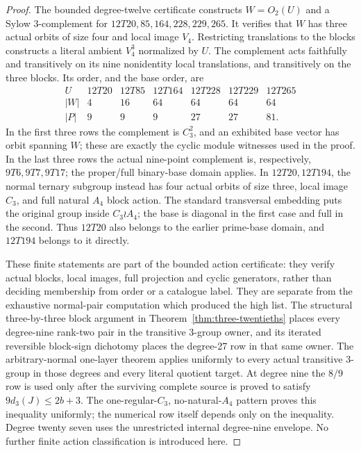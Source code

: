 \begin{proof}
The bounded degree-twelve certificate constructs $W=O_2(U)$ and a
Sylow $3$-complement for $12T20,85,164,228,229,265$. It verifies
that $W$ has three actual orbits of size four and local image $V_4$.
Restricting translations to the blocks constructs a literal ambient
$V_4^3$ normalized by $U$. The complement acts faithfully and
transitively on its nine nonidentity local translations, and
transitively on the three blocks. Its order, and the base order, are
\[
\begin{array}{c|rrrrrr}
 U&12T20&12T85&12T164&12T228&12T229&12T265\\\hline
 |W|&4&16&64&64&64&64\\
 |P|&9&9&9&27&27&81.
\end{array}
\]
In the first three rows the complement is $C_3^2$, and an exhibited
base vector has orbit spanning $W$; these are exactly the cyclic
module witnesses used in the proof. In the last three rows the
actual nine-point complement is, respectively, $9T6,9T7,9T17$;
the proper/full binary-base domain applies. In $12T20,12T194$,
the normal ternary subgroup instead has four actual orbits of size
three, local image $C_3$, and full natural $A_4$ block action.
The standard transversal embedding puts the original group inside
$C_3\wr A_4$; the base is diagonal in the first case and full in
the second. Thus $12T20$ also belongs to the earlier prime-base
domain, and $12T194$ belongs to it directly.

These finite statements are part of the bounded action certificate:
they verify actual blocks, local images, full projection and cyclic
generators, rather than deciding membership from order or a catalogue
label. They are separate from the exhaustive normal-pair computation
which produced the high list.  The structural three-by-three block argument
in Theorem~\ref{thm:three-twentieths} places every degree-nine rank-two pair
in the transitive $3$-group owner, and its iterated reversible block-sign
dichotomy places the degree-27 row in that same owner.  The arbitrary-normal
one-layer theorem applies uniformly to every actual transitive $3$-group in
those degrees and every literal quotient target.  At degree nine the $8/9$
row is used only after the surviving complete source is proved to satisfy
$9d_3(J)\leq2b+3$.  The one-regular-$C_3$, no-natural-$A_4$ pattern proves
this inequality uniformly; the numerical row itself depends only on the
inequality.  Degree twenty seven uses the unrestricted internal degree-nine
envelope.  No further finite action classification is introduced here.
\end{proof}

